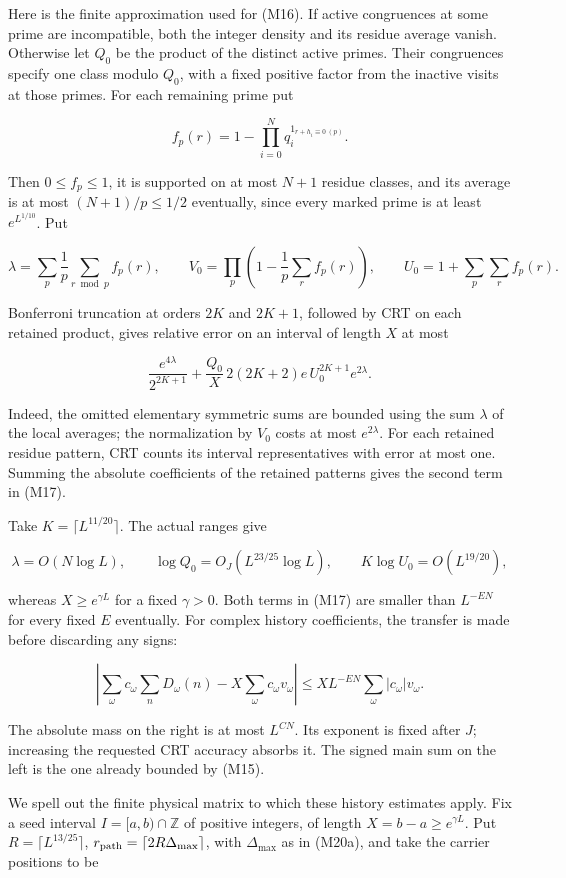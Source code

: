Here is the finite approximation used for (M16). If active congruences
at some prime are incompatible, both the integer density and its residue
average vanish. Otherwise let \(Q_0\) be the product of the distinct
active primes. Their congruences specify one class modulo \(Q_0\), with
a fixed positive factor from the inactive visits at those primes. For
each remaining prime put

\[
f_p(r)=1-\prod_{i=0}^N q_i^{1_{r+h_i\equiv0\ (p)}}.
\]

Then \(0\le f_p\le1\), it is supported on at most \(N+1\) residue
classes, and its average is at most \((N+1)/p\le1/2\) eventually, since
every marked prime is at least \(e^{L^{1/10}}\). Put

\[
\lambda=\sum_p\frac1p\sum_{r\bmod p}f_p(r),\qquad
V_0=\prod_p\left(1-\frac1p\sum_r f_p(r)\right),\qquad
U_0=1+\sum_p\sum_r f_p(r).
\]

Bonferroni truncation at orders \(2K\) and \(2K+1\), followed by CRT on
each retained product, gives relative error on an interval of length
\(X\) at most

\[
\frac{e^{4\lambda}}{2^{2K+1}}
 +\frac{Q_0}{X}\,2(2K+2)e\,U_0^{2K+1}e^{2\lambda}. \tag{M17}
\]

Indeed, the omitted elementary symmetric sums are bounded using the sum
\(\lambda\) of the local averages; the normalization by \(V_0\) costs at
most \(e^{2\lambda}\). For each retained residue pattern, CRT counts its
interval representatives with error at most one. Summing the absolute
coefficients of the retained patterns gives the second term in (M17).

Take \(K=\lceil L^{11/20}\rceil\). The actual ranges give

\[
\lambda=O(N\log L),\qquad
\log Q_0=O_J(L^{23/25}\log L),\qquad
K\log U_0=O(L^{19/20}),
\]

whereas \(X\ge e^{\gamma L}\) for a fixed \(\gamma>0\). Both terms in
(M17) are smaller than \(L^{-EN}\) for every fixed \(E\) eventually. For
complex history coefficients, the transfer is made before discarding any
signs:

\[
\left|\sum_\omega c_\omega\sum_nD_\omega(n)
 -X\sum_\omega c_\omega v_\omega\right|
\le XL^{-EN}\sum_\omega|c_\omega|v_\omega. \tag{M18}
\]

The absolute mass on the right is at most \(L^{CN}\). Its exponent is
fixed after \(J\); increasing the requested CRT accuracy absorbs it. The
signed main sum on the left is the one already bounded by (M15).

We spell out the finite physical matrix to which these history estimates
apply. Fix a seed interval \(I=[a,b)\cap\mathbb Z\) of positive
integers, of length \(X=b-a\ge e^{\gamma L}\). Put
\(R=\lceil L^{13/25}\rceil\),
\(r_{\rm path}=\lceil2R\Delta_{\max}\rceil\), with \(\Delta_{\max}\) as
in (M20a), and take the carrier positions to be

